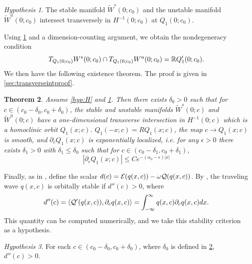 \documentclass[10pt,reqno]{amsart}
\theoremstyle{plain}
\newtheorem{theorem}{Theorem}
\theoremstyle{definition}
\theoremstyle{remark}
\newtheorem{hypothesis}[theorem]{Hypothesis}
\numberwithin{theorem}{section}
\numberwithin{equation}{section}
\begin{document}
\begin{hypothesis}\label{hyp:transverse}
The stable manifold $\tilde{W}^s(0; c_0)$ and the unstable manifold $\tilde{W}^u(0; c_0)$ intersect transversely in $H^{-1}(0; c_0)$ at $Q_1(0; c_0)$.
\end{hypothesis}

\noi Using \cref{hyp:transverse} and a dimension-counting argument, we obtain the nondegeneracy condition
\begin{equation}\label{nondegencond}
T_{Q_1(0; c_0)}W^s(0; c_0) \cap T_{Q_1(0; c_0)}W^u(0; c_0) = \mathbb{R} Q_1'(0; c_0).
\end{equation}
We then have the following existence theorem. The proof is given in \cref{sec:transverseintproof}.

\begin{theorem}\label{transverseint}
Assume \cref{hyp:H} and \cref{hyp:transverse}. Then there exists $\delta_0 > 0$ such that for $c \in (c_0 - \delta_0, c_0 + \delta_0)$, the stable and unstable manifolds $\tilde{W}^s(0; c)$ and $\tilde{W}^u(0; c)$ have a one-dimensional transverse intersection in $H^{-1}(0; c)$ which is a homoclinic orbit $Q_1(x; c)$. $Q_1(-x; c) = R Q_1(x; c)$, the map $c \rightarrow Q_1(x; c)$ is smooth, and $\partial_c Q_1(x; c)$ is exponentially localized, i.e. for any $\epsilon > 0$ there exists $\delta_1 > 0$ with $\delta_1 \leq \delta_0$ such that for $c \in (c_0 - \delta_1, c_0 + \delta_1)$,
\begin{equation}\label{Qcbound}
|\partial_c Q_1(x; c)| \leq C e^{-(\alpha_0 - \epsilon)|x|}
\end{equation}
\end{theorem}

Finally, as in \cite{Grillakis1987}, define the scalar $d(c) = \mathcal{E}(q(x, c)) - \omega\mathcal{Q}(q(x, c))$. By \cite{Bona1987,Grillakis1987}, the traveling wave $q(x, c)$ is orbitally stable if $d''(c) > 0$, where
\begin{align}\label{ddoubleprime}
d''(c) = \langle \mathcal{Q}'(q(x, c)), \partial_c q(x, c) \rangle
= \int_{-\infty}^\infty q(x, c) \partial_c q(x, c) dx.
\end{align}
This quantity can be computed numerically, and we take this stability criterion as a hypothesis.

\begin{hypothesis}\label{hyp:dccpos}
For each $c \in (c_0 - \delta_0, c_0 + \delta_0)$, where $\delta_0$ is defined in \cref{transverseint}, $d''(c) > 0$.
\end{hypothesis}
\end{document}
